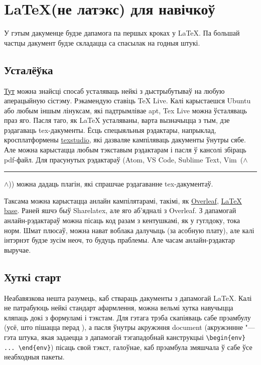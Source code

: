 


	\section{\LaTeX (не латэкс)  для навічкоў}
	
	У гэтым дакуменце будзе дапамога па першых кроках у \LaTeX. Па большай частцы дакумент будзе складацца са спасылак на годныя штукі. 
	
	\subsection{Усталёўка}
	
	\href{https://www.latex-project.org/get/}{Тут} можна знайсці спосаб усталяваць нейкі з дыстрыбутываў на любую аперацыйную сістэму. Рэкамендую ставіць TeX Live. Калі карыстаешся Ubuntu або любым іншым лінуксам, які падтрымлівае apt, Tex Live можна ўсталяваць праз яго. Пасля таго, як LaTeX усталяваны, варта вызначыцца з тым, дзе рэдагаваць tex-дакументы. Ёсць спецыяльныя рэдактары, напрыклад, кросплатформены \href{https://www.texstudio.org}{texstudio}, які дазваляе кампіляваць дакументы ўнутры сябе. Але можна карыстацца любым тэкставым рэдактарам і пасля ў кансолі збіраць pdf-файл. Для прасунутых рэдактараў (Atom, VS Code, Sublime Text, Vim~($\wedge$\noindent\rule{0.3cm}{0.4pt}$\wedge$)) можна дадаць плагін, які спрашчае рэдагаванне tex-дакументаў. 
	
	Таксама можна карыстацца анлайн кампілятарамі, такімі, як \href{https://www.overleaf.com/project}{Overleaf}, \href{https://latexbase.com/}{LaTeX base}. Раней яшчэ быў Sharelatex, але яго аб'ядналі з Overleaf. З дапамогай анлайн-рэдактараў можна пісаць код разам з кентушкамі, як у гуглдоку, тока норм. Шмат плюсаў, можна нават воблака далучыць (за асобную плату), але калі інтэрнэт будзе зусім неоч, то будуць праблемы. Але часам анлайн-рэдактар выручае.
		
	\subsection{Хуткі старт}
		
	Неабавязкова нешта разумець, каб ствараць дакументы з дапамогай \LaTeX. Калі не патрабуюць нейкі стандарт афармлення, можна вельмі хутка навучыцца кляпаць докі з формуламі і тэкстам. Для гэтага трэба скапіяваць сабе прэамбулу (усё, што пішацца перад \verb||), а пасля ўнутры акружэння document (акружэннне "--- гэта штука, якая задаецца з дапамогай тэгападобнай канструкцыі \verb|\begin{env} ... \end{env}|) пісаць свой тэкст, галоўнае, каб прэамбула змяшчала ў сабе ўсе неабходныя пакеты.
		
